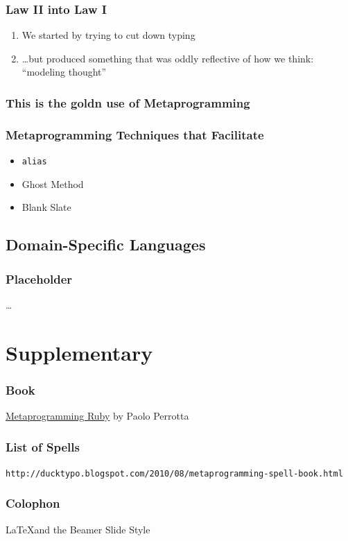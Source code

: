 \documentclass[slidestop,compress,mathserif,notes]{beamer}
\begin{document}
\begin{frame}
	\frametitle{Law II into Law I}
	\begin{enumerate}
		\item We started by trying to cut down typing
		\item \ldots but produced something that was oddly reflective of how we think: ``modeling thought''
	\end{enumerate}
\end{frame}

\begin{frame}
	\frametitle{This is the goldn use of Metaprogramming}
\end{frame}

\begin{frame}
	\frametitle{Metaprogramming Techniques that Facilitate}
	\begin{itemize}
		\item \texttt{alias}
		\item Ghost Method
		\item Blank Slate
	\end{itemize}
\end{frame}


\subsection{Domain-Specific Languages} %
\label{sub:domain_specific_languages}
\begin{frame}
	\frametitle{Placeholder}
	\ldots
\end{frame}



\section{Supplementary} %
\label{sec:supplementary}

\begin{frame}
	\frametitle{Book}
	\underline{Metaprogramming Ruby} by Paolo Perrotta
\end{frame}

\begin{frame}
	\frametitle{List of Spells}
	\texttt{http://ducktypo.blogspot.com/2010/08/metaprogramming-spell-book.html}
\end{frame}

\begin{frame}
	\frametitle{Colophon}
	\LaTeX and the Beamer Slide Style
\end{frame}
\end{document}
